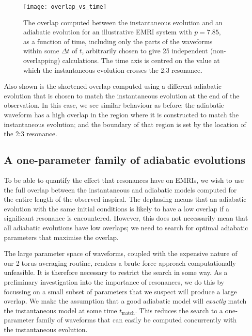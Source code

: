 \begin{figure}[htbp]
\centering
\texttt{[image: overlap\_vs\_time]}
\caption{\label{fig:overlap-dephasing}The overlap computed between the instantaneous evolution and an adiabatic evolution for an illustrative EMRI system with $p=7.85$, as a function of time, including only the parts of the waveforms within some $\Delta t$ of $t$, arbitrarily chosen to give 25 independent (non-overlapping) calculations. The time axis is centred on the value at which the instantaneous evolution crosses the 2:3 resonance.}
\end{figure}

Also shown is the shortened overlap computed using a different adiabatic evolution that is chosen to match the instantaneous evolution at the end of the observation. In this case, we see similar behaviour as before: the adiabatic waveform has a high overlap in the region where it is constructed to match the instantaneous evolution; and the boundary of that region is set by the location of the 2:3 resonance.

\subsection{A one-parameter family of adiabatic evolutions}
\label{sec:effres-1p-family}
To be able to quantify the effect that resonances have on EMRIs, we wish to use the full overlap between the instantaneous and adiabatic models computed for the entire length of the observed inspiral. The dephasing means that an adiabatic evolution with the same initial conditions is likely to have a low overlap if a significant resonance is encountered. However, this does not necessarily mean that all adiabatic evolutions have low overlaps; we need to search for optimal adiabatic parameters that maximise the overlap.

The large parameter space of waveforms, coupled with the expensive nature of our 2-torus averaging routine, renders a brute force approach computationally unfeasible. It is therefore necessary to restrict the search in some way. As a preliminary investigation into the importance of resonances, we do this by focussing on a small subset of parameters that we suspect will produce a large overlap. We make the assumption that a good adiabatic model will \emph{exactly} match the instantaneous model at some time $t_{\mathrm{match}}$. This reduces the search to a one-parameter family of waveforms that can easily be computed concurrently with the instantaneous evolution.

